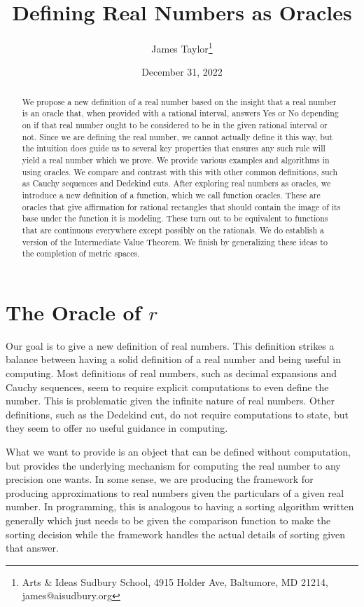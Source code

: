 \documentclass[12pt]{article}
\title{Defining Real Numbers as Oracles}
\author{
  James Taylor\footnote{Arts \& Ideas Sudbury School, 4915 Holder Ave, Baltumore, MD 21214, james@aisudbury.org}
}
\date{December 31, 2022}
\theoremstyle{remark}
\begin{document}
\maketitle
\begin{abstract}
 We propose a new definition of a real number based on the insight that a real number is an oracle that, when provided with a rational interval, answers Yes or No depending on if that real number ought to be considered to be in the given rational interval or not. Since we are defining the real number, we cannot actually define it this way, but the intuition does guide us to several key properties that ensures any such rule will yield a real number which we prove. We provide various examples and algorithms in using oracles. We compare and contrast with this with other common definitions, such as Cauchy sequences and Dedekind cuts. After exploring real numbers as oracles, we introduce a new definition of a function, which we call function oracles. These are oracles that give affirmation for rational rectangles that should contain the image of its base under the function it is modeling. These turn out to be equivalent to functions that are continuous everywhere except possibly on the rationals. We do establish a version of the Intermediate Value Theorem. We finish by generalizing these ideas to the completion of metric spaces. 
\end{abstract}

\tableofcontents

\section{The Oracle of $r$}\label{sec:ora}

Our goal is to give a new definition of real numbers. This definition strikes a balance between having a solid definition of a real number and being useful in computing. Most definitions of real numbers, such as decimal expansions and Cauchy sequences, seem to require explicit computations to even define the number. This is problematic given the infinite nature of real numbers. Other definitions, such as the Dedekind cut, do not require computations to state, but they seem to offer no useful guidance in computing. 

What we want to provide is an object that can be defined without computation, but provides the underlying mechanism for computing the real number to any precision one wants. In some sense, we are producing the framework for producing approximations to real numbers given the particulars of a given real number. In programming, this is analogous to having a sorting algorithm written generally which just needs to be given the comparison function to make the sorting decision while the framework handles the actual details of sorting given that answer. 
\end{document}
